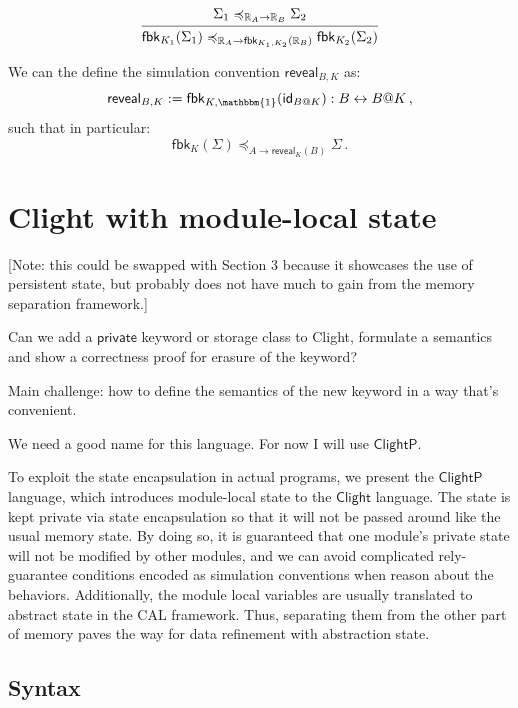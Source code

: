 \documentclass[acmsmall,screen,review,anonymous]{acmart}
\newcommand{\kw}[1]{\ensuremath{ \mathsf{#1} }}
\renewcommand{\preceq}{\preccurlyeq}
\newcommand{\ClightP}{\ensuremath{ \mathsf{ClightP} }}
\newcommand{\Clight}{\ensuremath{ \mathsf{Clight} }}
\begin{document}
\begin{lemma}
\[
  \begin{prooftree}
    \hypo{\Sigma_1 \preceq_{\mathbb{R}_A \rightarrow \mathbb{R}_B} \Sigma_2}
    \infer1{
      \kw{fbk}_{K_1}(\Sigma_1)
      \preceq_{\mathbb{R}_A \rightarrow \kw{fbk}_{K_1, K_2}(\mathbb{R}_B)}
      \kw{fbk}_{K_2}(\Sigma_2)}
  \end{prooftree}
\]
\end{lemma}

We can the define the simulation convention $\kw{reveal}_{B,K}$ as:
\[
  \kw{reveal}_{B,K} := \kw{fbk}_{K,\mathbbm{1}}(\kw{id}_{B@K}) : B \leftrightarrow B@K
  \,,
\]
such that in particular:
\[
  \kw{fbk}_K(\Sigma)
  \preceq_{A \rightarrow \kw{reveal}_K(B)}
  \Sigma
  \,.
\]



\section{Clight with module-local state} \label{sec:clightp} %

{
\color{gray}
[Note: this could be swapped with Section 3
because it showcases the use of persistent state,
but probably does not have much to gain
from the memory separation framework.]

Can we add a $\mathsf{private}$ keyword or storage class to Clight,
formulate a semantics and show a correctness proof
for erasure of the keyword?

Main challenge: how to define the semantics of the new keyword
in a way that's convenient.

We need a good name for this language.
For now I will use \ClightP{}.
}

To exploit the state encapsulation in actual programs,
we present the \ClightP{} language,
which introduces module-local state to the $\Clight$ language.
The state is kept private via state encapsulation
so that it will not be passed around like the usual memory state.
By doing so, it is guaranteed that
one module's private state will not be modified by other modules,
and we can avoid complicated rely-guarantee conditions
encoded as simulation conventions
when reason about the behaviors.
Additionally,
the module local variables are usually translated
to abstract state in the CAL framework.
Thus, separating them from the other part of memory
paves the way for data refinement with abstraction state.

\subsection{Syntax}
\end{document}
